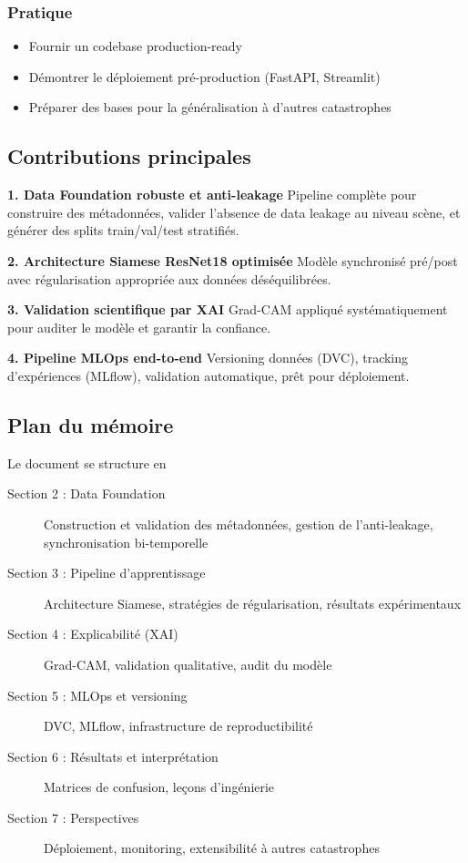 \subsubsection{Pratique}
\begin{itemize}
    \item Fournir un codebase production-ready
    \item Démontrer le déploiement pré-production (FastAPI, Streamlit)
    \item Préparer des bases pour la généralisation à d'autres catastrophes
\end{itemize}

\subsection{Contributions principales}

\textbf{1. Data Foundation robuste et anti-leakage}\: 
Pipeline complète pour construire des métadonnées, valider l'absence de data leakage au niveau scène, 
et générer des splits train/val/test stratifiés.

\textbf{2. Architecture Siamese ResNet18 optimisée}\: 
Modèle synchronisé pré/post avec régularisation appropriée aux données déséquilibrées.

\textbf{3. Validation scientifique par XAI}\: 
Grad-CAM appliqué systématiquement pour auditer le modèle et garantir la confiance.

\textbf{4. Pipeline MLOps end-to-end}\: 
Versioning données (DVC), tracking d'expériences (MLflow), validation automatique, prêt pour déploiement.

\subsection{Plan du mémoire}

Le document se structure en\:

\begin{description}
    \item[Section 2 : Data Foundation] Construction et validation des métadonnées, 
        gestion de l'anti-leakage, synchronisation bi-temporelle
    \item[Section 3 : Pipeline d'apprentissage] Architecture Siamese, 
        stratégies de régularisation, résultats expérimentaux
    \item[Section 4 : Explicabilité (XAI)] Grad-CAM, validation qualitative, audit du modèle
    \item[Section 5 : MLOps et versioning] DVC, MLflow, infrastructure de reproductibilité
    \item[Section 6 : Résultats et interprétation] Matrices de confusion, leçons d'ingénierie
    \item[Section 7 : Perspectives] Déploiement, monitoring, extensibilité à autres catastrophes
\end{description}


